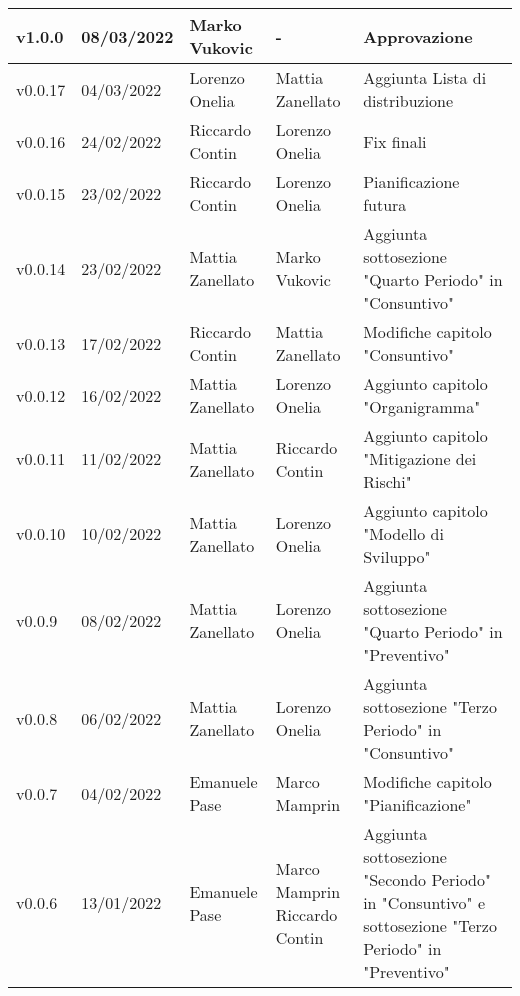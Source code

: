 {\begin{longtable}{|C{1.8cm}|C{2.1cm}|C{2cm}|C{2.4cm}|L{4.4cm}|}
  v1.0.0        & 08/03/2022    & Marko Vukovic   &  -                 & Approvazione \\ \hline
  v0.0.17       & 04/03/2022    & Lorenzo Onelia  & Mattia Zanellato     & Aggiunta Lista di distribuzione                  \\ \hline
  v0.0.16       & 24/02/2022     & Riccardo Contin  & Lorenzo Onelia                                & Fix finali \\ \hline
  v0.0.15       & 23/02/2022    & Riccardo Contin   & Lorenzo Onelia                  & Pianificazione futura \\ \hline
  v0.0.14       & 23/02/2022    & Mattia Zanellato  & Marko Vukovic                   & Aggiunta sottosezione "Quarto Periodo" in "Consuntivo" \\ \hline
  v0.0.13       & 17/02/2022    & Riccardo Contin   & Mattia Zanellato                & Modifiche capitolo "Consuntivo" \\ \hline
  v0.0.12       & 16/02/2022    & Mattia Zanellato  & Lorenzo Onelia                  & Aggiunto capitolo "Organigramma" \\ \hline
  v0.0.11       & 11/02/2022    & Mattia Zanellato  & Riccardo Contin                 & Aggiunto capitolo "Mitigazione dei Rischi" \\ \hline
  v0.0.10       & 10/02/2022    & Mattia Zanellato  & Lorenzo Onelia                  & Aggiunto capitolo "Modello di Sviluppo" \\ \hline
  v0.0.9        & 08/02/2022    & Mattia Zanellato  & Lorenzo Onelia                  & Aggiunta sottosezione "Quarto Periodo" in "Preventivo" \\ \hline
  v0.0.8        & 06/02/2022    & Mattia Zanellato  & Lorenzo Onelia                  & Aggiunta sottosezione "Terzo Periodo" in "Consuntivo" \\ \hline
  v0.0.7        & 04/02/2022    & Emanuele Pase     & Marco Mamprin                   & Modifiche capitolo "Pianificazione" \\ \hline
  v0.0.6        & 13/01/2022    & Emanuele Pase     & Marco Mamprin Riccardo Contin   & Aggiunta sottosezione "Secondo Periodo" in "Consuntivo" e sottosezione "Terzo Periodo" in "Preventivo" \\ \hline

\end{longtable}}
